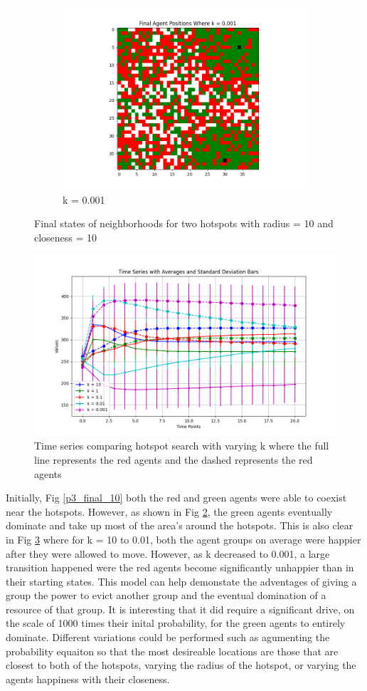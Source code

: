 \documentclass[11pt]{article}
\begin{document}
\begin{figure}[h]
\begin{subfigure}{0.2\textwidth}
			\includegraphics[width=\linewidth]{policy3_Final_0001.png}
			\caption{\centering k = 0.001}
			\label{p3_final_0001}
		\end{subfigure}
		\caption{Final states of neighborhoods for two hotspots with radius = 10 and closeness = 10}
	\end{figure}
	\FloatBarrier
	
	\begin{figure}
		\centering
		\includegraphics[width=.5\textwidth]{policies03.png}
		\caption{Time series comparing hotspot search with varying k where the full line represents the red agents and the dashed represents the red agents}
		\label{p3_ts}
	\end{figure}
	\FloatBarrier
	Initially, Fig \ref{p3_final_10} both the red and green agents were able to coexist near the hotspots. However, as shown in Fig \ref{p3_final_0001}, the green agents eventually dominate and take up most of the area's around the hotspots. This is also clear in Fig \ref{p3_ts} where for k = 10 to 0.01, both the agent groups on average were happier after they were allowed to move. However, as k decreased to 0.001, a large transition happened were the red agents become significantly unhappier than in their starting states. This model can help demonstate the adventages of giving a group the power to evict another group and the eventual domination of a resource of that group. It is interesting that it did require a significant drive, on the scale of 1000 times their inital probability, for the green agents to entirely dominate. Different variations could be performed such as agumenting the probability equaiton so that the most desireable locations are those that are closest to both of the hotspots, varying the radius of the hotspot, or varying the agents happiness with their closeness. 
	
\end{document}
